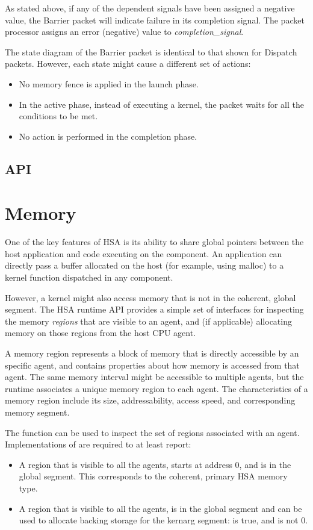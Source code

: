 \documentclass[final]{book}
\newcommand{\reffld}[1]{\textit{#1}}
\begin{document}
As stated above, if any of the dependent signals have been assigned a negative
value, the Barrier packet will indicate failure in its completion signal. The
packet processor assigns an error (negative) value to
\reffld{completion_signal}.

The state diagram of the Barrier packet is identical to that shown for Dispatch
packets. However, each state might cause a different set of actions:
\begin{itemize}
\item No memory fence is applied in the launch phase.
\item In the active phase, instead of executing a kernel, the packet waits for
  all the conditions to be met.
\item No action is performed in the completion phase.
\end{itemize}

\subsection{API}


\section{Memory}\label{memory}

One of the key features of HSA is its ability to share global pointers between
the host application and code executing on the component. An application can
directly pass a buffer allocated on the host (for example, using malloc) to a
kernel function dispatched in any component.

However, a kernel might also access memory that is not in the coherent, global
segment. The HSA runtime API provides a simple set of interfaces for inspecting
the memory \emph{regions} that are visible to an agent, and (if applicable)
allocating memory on those regions from the host CPU agent.

A memory region represents a block of memory that is directly accessible by an
specific agent, and contains properties about how memory is accessed from that
agent. The same memory interval might be accessible to multiple agents, but the
runtime associates a unique memory region to each agent. The characteristics of
a memory region include its size, addressability, access speed, and
corresponding memory segment.

The function  can be used to inspect the set
of regions associated with an agent. Implementations of
 are required to at least report:
\begin{itemize}[itemsep=1pt,topsep=3pt,partopsep=0pt]
\item A region that is visible to all the agents, starts at address 0, and is in
  the global segment. This corresponds to the coherent, primary HSA memory type.
\item A region that is visible to all the agents, is in the global segment and
  can be used to allocate backing storage for the kernarg segment:
   is true, and
   is not 0.
\end{itemize}
\end{document}
